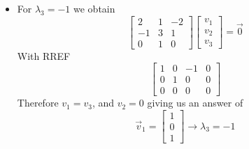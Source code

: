 \begin{enumerate}
\begin{itemize}
\[{\begin{array}{r}
                                \end{array} \right]
                                \to \lambda_2 = 1
                            }
                        \]
                    \item For $\lambda_3 = -1$ we obtain
                        \[
                            \left[ \begin{array}{rrr}
                                2 & 1 & -2\\
                                -1 & 3 & 1\\
                                0 & 1 & 0
                            \end{array} \right]
                            \left[ \begin{array}{r}
                                v_1\\ v_2\\ v_3
                            \end{array} \right]
                            = \vec{0}
                        \]
                        With RREF
                        \[
                            \left[ \begin{array}{rrr|r}
                                1 & 0 & -1 & 0\\
                                0 & 1 & 0 & 0\\
                                0 & 0 & 0 & 0
                            \end{array} \right]
                        \]
                        Therefore $v_1 = v_3$, and $v_2 = 0$ giving us an answer of
                        \[
                            \boxed{
                                \vec{v}_1 =
                                \left[ \begin{array}{r}
                                    1\\ 0\\ 1
                                \end{array} \right]
                                \to \lambda_3 = -1
                            }
                        \]
                \end{itemize}
        \end{enumerate}

